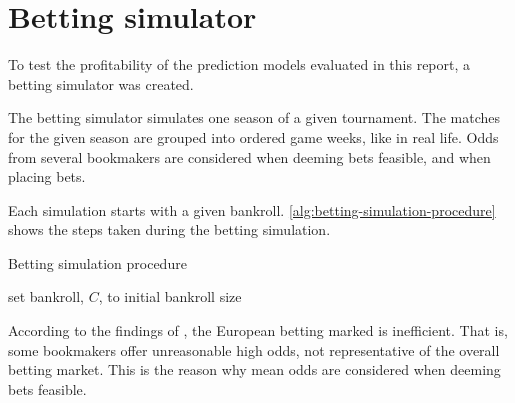 \section{Betting simulator}

To test the profitability of the prediction models evaluated in this report, a betting simulator was created.

The betting simulator simulates one season of a given tournament. The matches for the given season are grouped into ordered game weeks, like in real life. Odds from several bookmakers are considered when deeming bets feasible, and when placing bets.

Each simulation starts with a given bankroll. \cref{alg:betting-simulation-procedure} shows the steps taken during the betting simulation.
\begin{algorithm}
    \caption{Betting simulation procedure \label{alg:betting-simulation-procedure}}
    set bankroll, $C$, to initial bankroll size\;
\end{algorithm}

According to the findings of \citet{bib:vlastakis-dotsis-markellos-2009}, the European betting marked is inefficient. That is, some bookmakers offer unreasonable high odds, not representative of the overall betting market. This is the reason why mean odds are considered when deeming bets feasible.